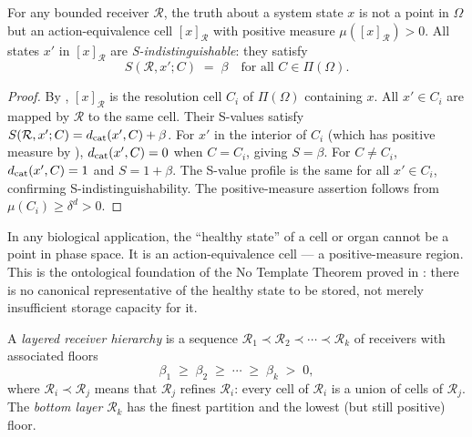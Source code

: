 \begin{theorem}
\label{thm:cell-truth}
For any bounded receiver $\mathcal{R}$, the truth about a system state $x$ is
not a point in $\Omega$ but an action-equivalence cell $[x]_\mathcal{R}$
with positive measure $\mu([x]_\mathcal{R}) > 0$.  All states $x'$ in
$[x]_\mathcal{R}$ are \emph{S-indistinguishable}: they satisfy
\[
  S(\mathcal{R}, x'; C) \;=\; \beta \quad \text{for all } C \in \Pi(\Omega) .
\]
\end{theorem}

\begin{proof}
By , $[x]_\mathcal{R}$ is the resolution cell
$C_i$ of $\Pi(\Omega)$ containing $x$.  All $x' \in C_i$ are mapped by
$\mathcal{R}$ to the same cell.  Their S-values satisfy
$S(\mathcal{R}, x'; C) = d_{\mathrm{cat}}(x', C) + \beta$.  For $x'$ in the interior
of $C_i$ (which has positive measure by ),
$d_{\mathrm{cat}}(x', C) = 0$ when $C = C_i$, giving $S = \beta$.  For $C \neq C_i$,
$d_{\mathrm{cat}}(x', C) = 1$ and $S = 1 + \beta$.  The S-value profile is the same for
all $x' \in C_i$, confirming S-indistinguishability.  The positive-measure
assertion follows from $\mu(C_i) \geq \delta^d > 0$.
\end{proof}

\begin{corollary}
\label{cor:healthy-state-cell}
In any biological application, the ``healthy state'' of a cell or organ cannot
be a point in phase space.  It is an action-equivalence cell — a positive-measure
region.  This is the ontological foundation of the No Template Theorem proved
in : there is no canonical representative of the healthy
state to be stored, not merely insufficient storage capacity for it.
\end{corollary}

\begin{definition}
\label{def:layered-receivers}
A \emph{layered receiver hierarchy} is a sequence
$\mathcal{R}_1 \prec \mathcal{R}_2 \prec \cdots \prec \mathcal{R}_k$ of
receivers with associated floors
\[
  \beta_1 \;\geq\; \beta_2 \;\geq\; \cdots \;\geq\; \beta_k \;>\; 0 ,
\]
where $\mathcal{R}_i \prec \mathcal{R}_j$ means that $\mathcal{R}_j$ refines
$\mathcal{R}_i$: every cell of $\mathcal{R}_i$ is a union of cells of
$\mathcal{R}_j$.  The \emph{bottom layer} $\mathcal{R}_k$ has the finest
partition and the lowest (but still positive) floor.
\end{definition}

